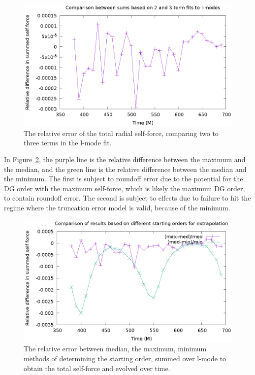 \begin{figure}
  \includegraphics{relativeError23termSelfForce.eps}
  \caption{The relative error of the total radial self-force, comparing two to three terms in the l-mode fit.}
  \label{relErr23terms}
\end{figure}

In Figure~\ref{minmaxmedRelErr}, the purple line is the relative difference between the maximum and the median, and the green line is the relative difference between the median and the minimum. The first is subject to roundoff error due to the potential for the DG order with the maximum self-force, which is likely the maximum DG order, to contain roundoff error. The second is subject to effects due to failure to hit the regime where the truncation error model is valid, because of the minimum. 

\begin{figure}
  \includegraphics{minmaxmedrelativeerror3termavgl.eps}
  \caption{The relative error between median, the maximum, minimum methods of determining the starting order, summed over l-mode to obtain the total self-force and evolved over time.}
    \label{minmaxmedRelErr}
\end{figure}
  




